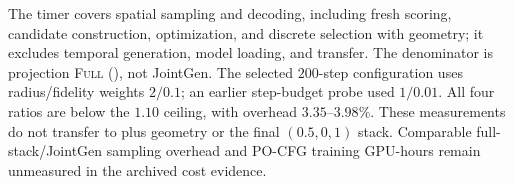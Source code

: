 The timer covers spatial sampling and decoding, including fresh scoring,
candidate construction, optimization, and discrete selection with geometry;
it excludes temporal generation, model loading, and transfer. The denominator
is projection \textsc{Full} (\pcdgp), not JointGen. The selected $200$-step
configuration uses radius/fidelity weights $2/0.1$; an earlier step-budget probe
used $1/0.01$. All four ratios are below the $1.10$ ceiling, with overhead
$3.35$--$3.98\%$. These measurements do not transfer to \pcdgpd plus geometry
or the final $(0.5,0,1)$ stack. Comparable full-stack/JointGen sampling
overhead and PO-CFG training GPU-hours remain unmeasured in the archived cost
evidence.
